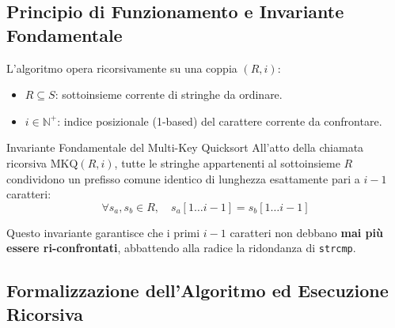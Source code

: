 \FloatBarrier
\subsection{Principio di Funzionamento e Invariante Fondamentale}
\label{subsec:principio-invariante-multikey}

L'algoritmo opera ricorsivamente su una coppia $(R, i)$:
\begin{itemize}
  \item $R \subseteq S$: sottoinsieme corrente di stringhe da ordinare.
  \item $i \in \mathbb{N}^+$: indice posizionale (1-based) del carattere corrente da confrontare.
\end{itemize}

\begin{alertblock}{Invariante Fondamentale del Multi-Key Quicksort}
All'atto della chiamata ricorsiva $\text{MKQ}(R, i)$, tutte le stringhe appartenenti al sottoinsieme $R$ condividono un prefisso comune identico di lunghezza esattamente pari a $i - 1$ caratteri:
\begin{equation}
  \forall s_a, s_b \in R, \quad s_a[1 \dots i-1] = s_b[1 \dots i-1]
\end{equation}
\end{alertblock}

Questo invariante garantisce che i primi $i-1$ caratteri non debbano \textbf{mai pi\`u essere ri-confrontati}, abbattendo alla radice la ridondanza di \texttt{strcmp}.

\FloatBarrier
\subsection{Formalizzazione dell'Algoritmo ed Esecuzione Ricorsiva}
\label{subsec:formalizzazione-algoritmo-mkq}

